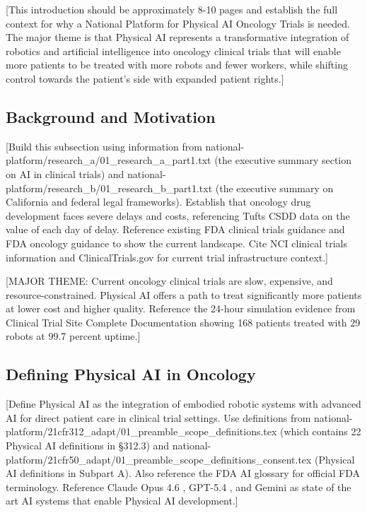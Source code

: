 
[This introduction should be approximately 8-10 pages and establish the full
context for why a National Platform for Physical AI Oncology Trials is needed.
The major theme is that Physical AI represents a transformative integration of
robotics and artificial intelligence into oncology clinical trials that will
enable more patients to be treated with more robots and fewer workers, while
shifting control towards the patient's side with expanded patient rights.]

\subsection{Background and Motivation}
\label{subsec:background}

[Build this subsection using information from
national-platform/research\_a/01\_research\_a\_part1.txt (the executive summary
section on AI in clinical trials) and
national-platform/research\_b/01\_research\_b\_part1.txt (the executive summary
on California and federal legal frameworks). Establish that oncology drug
development faces severe delays and costs, referencing Tufts CSDD data
\cite{tufts-delay} on the value of each day of delay. Reference existing FDA
clinical trials guidance \cite{fda-clinical-trials-guidance} and FDA oncology
guidance \cite{fda-oncology-guidance} to show the current landscape. Cite NCI
clinical trials information \cite{nci-clinical-trials} and ClinicalTrials.gov
\cite{clinicaltrials-gov} for current trial infrastructure context.]

[MAJOR THEME: Current oncology clinical trials are slow, expensive, and
resource-constrained. Physical AI offers a path to treat significantly more
patients at lower cost and higher quality. Reference the 24-hour simulation
evidence from Clinical Trial Site Complete Documentation \cite{site-docs}
showing 168 patients treated with 29 robots at 99.7 percent uptime.]

\subsection{Defining Physical AI in Oncology}
\label{subsec:defining-pai}

[Define Physical AI as the integration of embodied robotic systems with
advanced AI for direct patient care in clinical trial settings. Use definitions
from national-platform/21cfr312\_adapt/01\_preamble\_scope\_definitions.tex
(which contains 22 Physical AI definitions in \S 312.3) and
national-platform/21cfr50\_adapt/01\_preamble\_scope\_definitions\_consent.tex
(Physical AI definitions in Subpart A). Also reference the FDA AI glossary
\cite{fda-ai-glossary} for official FDA terminology. Reference Claude Opus 4.6
\cite{claude-opus}, GPT-5.4 \cite{gpt-5-4}, and Gemini \cite{gemini} as
state of the art AI systems that enable Physical AI development.]

